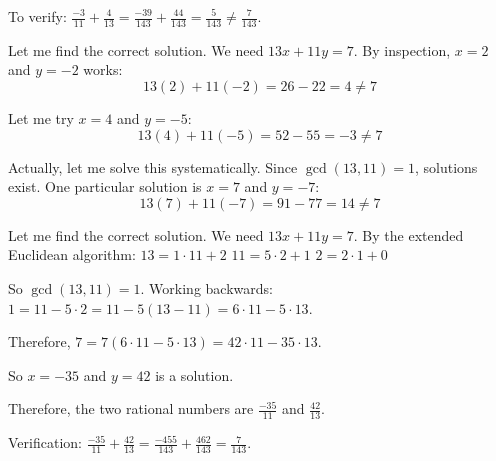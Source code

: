 \begin{enumerate}
\begin{subanswer}
    To verify: $\frac{-3}{11} + \frac{4}{13} = \frac{-39}{143} + \frac{44}{143} = \frac{5}{143} \neq \frac{7}{143}$.
    
    Let me find the correct solution. We need $13x + 11y = 7$. By inspection, $x = 2$ and $y = -2$ works:
    \[
      13(2) + 11(-2) = 26 - 22 = 4 \neq 7
    \]
    
    Let me try $x = 4$ and $y = -5$:
    \[
      13(4) + 11(-5) = 52 - 55 = -3 \neq 7
    \]
    
    Actually, let me solve this systematically. Since $\gcd(13,11) = 1$, solutions exist. One particular solution is $x = 7$ and $y = -7$:
    \[
      13(7) + 11(-7) = 91 - 77 = 14 \neq 7
    \]
    
    Let me find the correct solution. We need $13x + 11y = 7$. By the extended Euclidean algorithm:
    $13 = 1 \cdot 11 + 2$
    $11 = 5 \cdot 2 + 1$
    $2 = 2 \cdot 1 + 0$
    
    So $\gcd(13,11) = 1$. Working backwards: $1 = 11 - 5 \cdot 2 = 11 - 5(13 - 11) = 6 \cdot 11 - 5 \cdot 13$.
    
    Therefore, $7 = 7(6 \cdot 11 - 5 \cdot 13) = 42 \cdot 11 - 35 \cdot 13$.
    
    So $x = -35$ and $y = 42$ is a solution.
    
    Therefore, the two rational numbers are $\frac{-35}{11}$ and $\frac{42}{13}$.
    
    Verification: $\frac{-35}{11} + \frac{42}{13} = \frac{-455}{143} + \frac{462}{143} = \frac{7}{143}$.
  \end{subanswer}
\end{enumerate}
